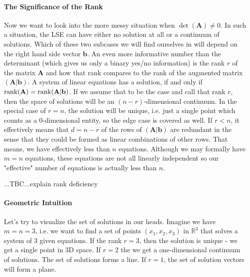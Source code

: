 \paragraph{The Significance of the Rank}
Now we want to look into the more messy situation when $\det(\mathbf{A}) \neq 0$. In such a situation, the LSE can have either no solution at all or a continuum of solutions. Which of these two subcases we will find ourselves in will depend on the right hand side vector $\mathbf{b}$. An even more informative number than the determinant (which gives us only a binary yes/no information) is the rank $r$ of the matrix $\mathbf{A}$ and how that rank compares to the rank of the augmented matrix $(\mathbf{A|b})$. A system of linear equations has a solution, if and only if $\operatorname{rank}(\mathbf{A}) = \operatorname{rank}(\mathbf{A|b})$. If we assume that to be the case and call that rank $r$, then the space of solutions will be an $(n-r)$-dimensional continuum. In the special case of $r = n$, the solution will be unique, i.e. just a single point which counts as a $0$-dimensional entity, so the edge case is covered as well. If $r < n$, it effectively means that $d = n-r$ of the rows of $(\mathbf{A|b})$ are redundant in the sense that they could be formed as linear combinations of other rows. That means, we have effectively less than $n$ equations. Although we may formally have $m = n$ equations, these equations are not all linearly independent so our "effective" number of equations is actually less than $n$.

...TBC...explain rank deficiency




\paragraph{Geometric Intuition} Let's try to visualize the set of solutions in our heads. Imagine we have $m=n=3$, i.e. we want to find a set of points $(x_1, x_2, x_3)$  in $\mathbb{R}^3$ that solves a system of 3 given equations. If the rank $r = 3$, then the solution is unique - we get a single point in 3D space. If $r=2$ the we get a one-dimensional continuum of solutions. The set of solutions forms a line. If $r=1$, the set of solution vectors will form a plane.

